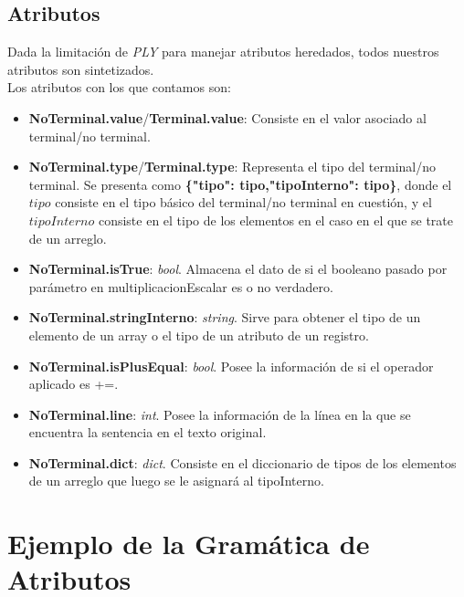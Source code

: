 \documentclass[10pt,a4paper]{article}
\begin{document}
\newpage
\subsection{Atributos}

Dada la limitación de \textit{PLY} para manejar atributos heredados, todos nuestros atributos son sintetizados.\\

Los atributos con los que contamos son:
\begin{itemize}
\item \textbf{NoTerminal.value}/\textbf{Terminal.value}: Consiste en el valor asociado al terminal/no terminal.
\item \textbf{NoTerminal.type}/\textbf{Terminal.type}: Representa el tipo del terminal/no terminal. Se presenta como \textbf{\{"tipo": tipo,"tipoInterno": tipo\}}, donde el $tipo$ consiste en el tipo básico del terminal/no terminal en cuestión, y el $tipoInterno$ consiste en el tipo de los elementos en el caso en el que se trate de un arreglo.
\item \textbf{NoTerminal.isTrue}: \textit{bool}. Almacena el dato de si el booleano pasado por parámetro en multiplicacionEscalar es o no verdadero.
\item \textbf{NoTerminal.stringInterno}: \textit{string}. Sirve para obtener el tipo de un elemento de un array o el tipo de un atributo de un registro.
\item \textbf{NoTerminal.isPlusEqual}: \textit{bool}. Posee la información de si el operador aplicado es +=.
\item \textbf{NoTerminal.line}: \textit{int}. Posee la información de la línea en la que se encuentra la sentencia en el texto original.
\item \textbf{NoTerminal.dict}: \textit{dict}. Consiste en el diccionario de tipos de los elementos de un arreglo que luego se le asignará al tipoInterno.
\end{itemize}

\section{Ejemplo de la Gramática de Atributos}
\end{document}
